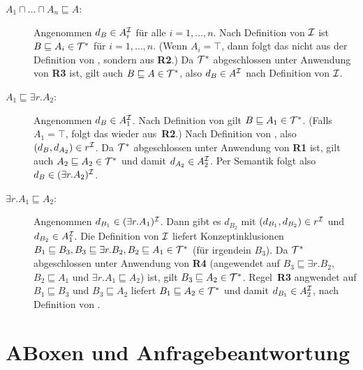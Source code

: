 \documentclass[fontsize=11pt, twoside=false, numbers=autoenddot]{scrbook}
\begin{document}
\begin{description}
  \item[{\boldmath $A_1\sqcap\ldots\sqcap A_n\sqsubseteq A$}:] 
    Angenommen
    $d_B\in A_i^\mathcal{I}$ für alle $i=1,\ldots,n$. Nach Definition von
    $\mathcal{I}$ ist $B\sqsubseteq A_i\in \mathcal{T}^*$ für $i=1,\ldots,n$. (Wenn
    $A_i=\top$, dann folgt das nicht aus der Definition von \Imc, sondern
    aus \textbf{\textsf{R2}}.) Da $\mathcal{T}^*$ abgeschlossen unter Anwendung
    von \textbf{\textsf{R3}} ist, gilt auch $B\sqsubseteq A\in \mathcal{T}^*$,
    also $d_B\in A^\mathcal{I}$ nach Definition von $\mathcal{I}$.
  \item[{\boldmath $A_1\sqsubseteq \exists r.A_2$}:] 
    Angenommen $d_B\in A_1^\mathcal{I}$.
    Nach Definition von \Imc gilt $B\sqsubseteq A_1\in \mathcal{T}^*$. (Falls
    $A_1=\top$, folgt das wieder aus~\textbf{\textsf{R2}}.) Nach
    Definition von \Imc, also $(d_B,d_{A_2})\in r^\mathcal{I}$. 
    Da $\mathcal{T}^*$ abgeschlossen unter Anwendung
    von \textbf{\textsf{R1}} ist, gilt auch $A_2\sqsubseteq A_2\in
    \mathcal{T}^*$ und damit $d_{A_2}\in A_2^\mathcal{I}$. Per Semantik folgt also $d_B\in (\exists r.A_2)^\mathcal{I}$.
  \item[{\boldmath $\exists r.A_1\sqsubseteq A_2$}:] 
    Angenommen $d_{B_1}\in (\exists r.A_1)^\mathcal{I}$. Dann gibt es $d_{B_2}$
    mit $(d_{B_1},d_{B_2})\in r^\mathcal{I}$ und $d_{B_2}\in A_1^\mathcal{I}$. Die
    Definition von $\mathcal{I}$ liefert Konzeptinklusionen $B_1\sqsubseteq B_3,
    B_3\sqsubseteq \exists r.B_2, B_2\sqsubseteq A_1\in \mathcal{T}^*$ (für
    irgendein $B_3$). Da $\mathcal{T}^*$ abgeschlossen unter Anwendung
    von \textbf{\textsf{R4}} (angewendet auf $B_3\sqsubseteq \exists
    r.B_2$, $B_2\sqsubseteq A_1$ und $\exists r.A_1\sqsubseteq
    A_2$) ist,
    gilt $B_3\sqsubseteq A_2\in \mathcal{T}^*$. Regel~\textbf{\textsf{R3}}
    angwendet auf $B_1\sqsubseteq B_3$ und $B_3\sqsubseteq A_2$ liefert
    $B_1\sqsubseteq A_2\in \mathcal{T}^*$ und damit $d_{B_1}\in A_2^\mathcal{I}$, nach
    Definition von \Imc.
    \qedhere
\end{description}


\part{ABoxen und Anfragebeantwortung}

\newcommand{\BspABox}{T7.1}
\end{document}
